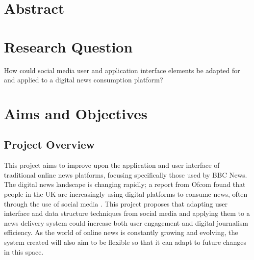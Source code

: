 \documentclass[12pt,titlepage]{article}
\begin{document}

\tableofcontents
\newpage

\section{Abstract}


\section{Research Question}

How could social media user and application interface elements be adapted for
and applied to a digital news consumption platform?

\section{Aims and Objectives}

  \subsection{Project Overview}


  This project aims to improve upon the application and user interface of
  traditional online news platforms, focusing specifically those used by BBC
  News. The digital news landscape is changing rapidly; a report from Ofcom
  found that people in the UK are increasingly using digital platforms to
  consume news, often through the use of social media \citep{ofcom}. This
  project proposes that adapting user interface and data structure techniques
  from social media and applying them to a news delivery system could increase
  both user engagement and digital journalism efficiency. As the world of online
  news is constantly growing and evolving, the system created will also aim to
  be flexible so that it can adapt to future changes in this space.
\end{document}
